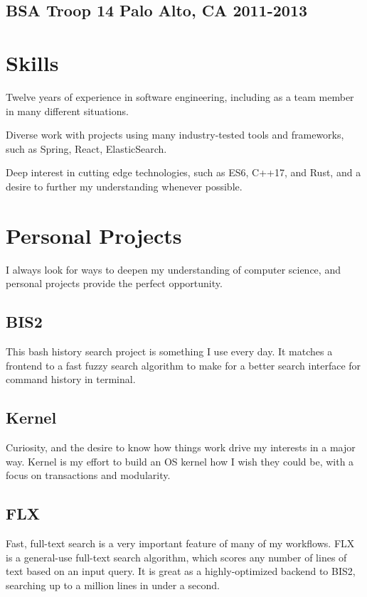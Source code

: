 \documentclass[letterpaper]{article}
\newcommand{\subtitle}{\normalfont\sffamily\color{black}\large}
\begin{document}
\begin{multicols}{2}
\subsection*{BSA Troop 14 \subtitle Palo Alto, CA 2011-2013}

\section*{Skills}

Twelve years of experience in software engineering, including as a team member
in many different situations. 

Diverse work with projects using many industry-tested tools and frameworks, such
as Spring, React, ElasticSearch.

Deep interest in cutting edge technologies, such as ES6, C++17, and Rust, and a
desire to further my understanding whenever possible.

\columnbreak

\section*{Personal Projects}

I always look for ways to deepen my understanding of computer science, and
personal projects provide the perfect opportunity.

\subsection*{BIS2}

This bash history search project is something I use every day. It matches a
frontend to a fast fuzzy search algorithm to make for a better search interface
for command history in terminal.

\subsection*{Kernel}

Curiosity, and the desire to know how things work drive my interests in a major
way. Kernel is my effort to build an OS kernel how I wish they could be, with a
focus on transactions and modularity.

\subsection*{FLX}

Fast, full-text search is a very important feature of many of my workflows. FLX
is a general-use full-text search algorithm, which scores any number of lines of
text based on an input query. It is great as a highly-optimized backend to BIS2,
searching up to a million lines in under a second.


\end{multicols}
\end{document}
